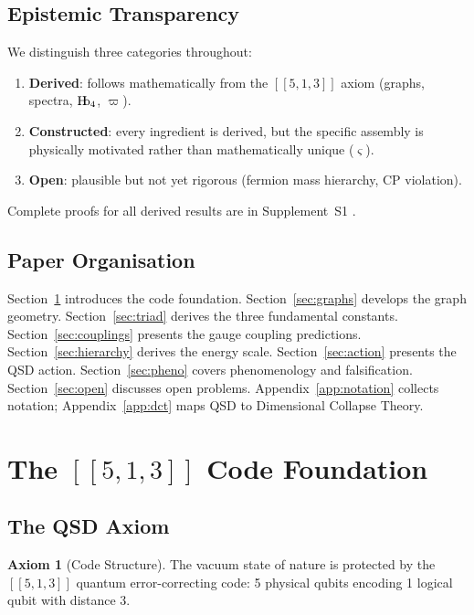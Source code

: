 \documentclass[11pt,a4paper]{article}
\theoremstyle{definition}
\newtheorem{axiom}{Axiom}
\newcommand{\Hb}{\textnormal{H\kern-0.3em b}}
\newcommand{\Hbfour}{\Hb_4}
\newcommand{\strain}{\varsigma}
\newcommand{\specbond}{\varpi}
\begin{document}
\subsection{Epistemic Transparency}

We distinguish three categories throughout:
\begin{enumerate}[nosep]
    \item \textbf{Derived}: follows mathematically from the $[[5,1,3]]$ axiom (graphs, spectra, $\Hbfour$, $\specbond$).
    \item \textbf{Constructed}: every ingredient is derived, but the specific assembly is physically motivated rather than mathematically unique ($\strain$).
    \item \textbf{Open}: plausible but not yet rigorous (fermion mass hierarchy, CP violation).
\end{enumerate}
Complete proofs for all derived results are in Supplement~S1 \cite{Hubka2026QSDsupp}.

\subsection{Paper Organisation}

Section~\ref{sec:code} introduces the code foundation. Section~\ref{sec:graphs} develops the graph geometry. Section~\ref{sec:triad} derives the three fundamental constants. Section~\ref{sec:couplings} presents the gauge coupling predictions. Section~\ref{sec:hierarchy} derives the energy scale. Section~\ref{sec:action} presents the QSD action. Section~\ref{sec:pheno} covers phenomenology and falsification. Section~\ref{sec:open} discusses open problems. Appendix~\ref{app:notation} collects notation; Appendix~\ref{app:dct} maps QSD to Dimensional Collapse Theory.

\section{The $[[5,1,3]]$ Code Foundation}
\label{sec:code}

\subsection{The QSD Axiom}

\begin{axiom}[Code Structure]
\label{axiom:code}
The vacuum state of nature is protected by the $[[5,1,3]]$ quantum error-correcting code: 5 physical qubits encoding 1 logical qubit with distance 3.
\end{axiom}
\end{document}
